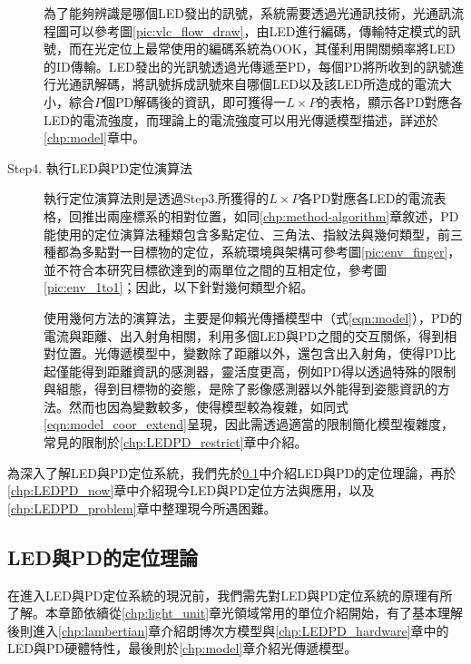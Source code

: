 \begin{description}
    \qquad
    為了能夠辨識是哪個LED發出的訊號，系統需要透過光通訊技術，光通訊流程圖可以參考圖\ref{pic:vlc_flow_draw}，由LED進行編碼，傳輸特定模式的訊號，而在光定位上最常使用的編碼系統為OOK，其僅利用開關頻率將LED的ID傳輸。LED發出的光訊號透過光傳遞至PD，每個PD將所收到的訊號進行光通訊解碼，將訊號拆成訊號來自哪個LED以及該LED所造成的電流大小，綜合$P$個PD解碼後的資訊，即可獲得一$L\times P$的表格，顯示各PD對應各LED的電流強度，而理論上的電流強度可以用光傳遞模型描述，詳述於\ref{chp:model}章中。
    
    \item[Step4. 執行LED與PD定位演算法] \hfill
    
    \qquad
    執行定位演算法則是透過Step3.所獲得的$L\times P$各PD對應各LED的電流表格，回推出兩座標系的相對位置，如同\ref{chp:method-algorithm}章敘述，PD能使用的定位演算法種類包含多點定位、三角法、指紋法與幾何類型，前三種都為多點對一目標物的定位，系統環境與架構可參考圖\ref{pic:env_finger}，並不符合本研究目標欲達到的兩單位之間的互相定位，參考圖\ref{pic:env_1to1}；因此，以下針對幾何類型介紹。

    \qquad
    使用幾何方法的演算法，主要是仰賴光傳播模型中（式\ref{eqn:model}），PD的電流與距離、出入射角相關，利用多個LED與PD之間的交互關係，得到相對位置。光傳遞模型中，變數除了距離以外，還包含出入射角，使得PD比起僅能得到距離資訊的感測器，靈活度更高，例如PD得以透過特殊的限制與組態，得到目標物的姿態\cite{case:orient}，是除了影像感測器以外能得到姿態資訊的方法。然而也因為變數較多，使得模型較為複雜，如同式\ref{eqn:model_coor_extend}呈現，因此需透過適當的限制簡化模型複雜度，常見的限制於\ref{chp:LEDPD_restrict}章中介紹。


\end{description}

\onehalfspacing

為深入了解LED與PD定位系統，我們先於\ref{chp:LEDPD_theorum}中介紹LED與PD的定位理論，再於\ref{chp:LEDPD_now}章中介紹現今LED與PD定位方法與應用，以及\ref{chp:LEDPD_problem}章中整理現今所遇困難。


\subsection{LED與PD的定位理論}  
\label{chp:LEDPD_theorum}

    在進入LED與PD定位系統的現況前，我們需先對LED與PD定位系統的原理有所了解。本章節依續從\ref{chp:light_unit}章光領域常用的單位介紹開始，有了基本理解後則進入\ref{chp:lambertian}章介紹朗博次方模型與\ref{chp:LEDPD_hardware}章中的LED與PD硬體特性，最後則於\ref{chp:model}章介紹光傳遞模型。

